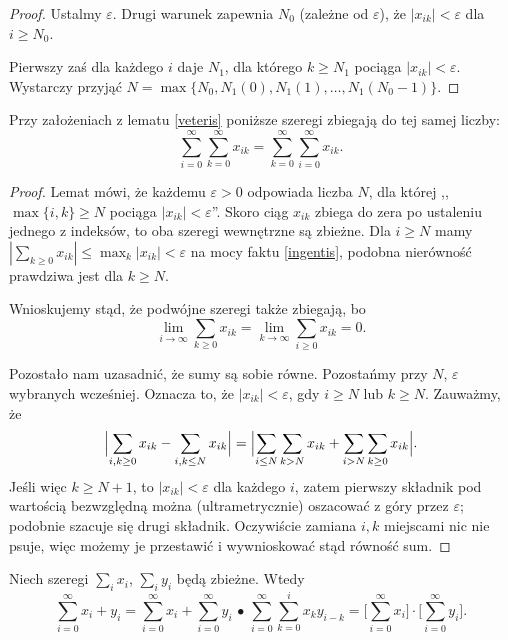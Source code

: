 \begin{proof}
	Ustalmy $\varepsilon$.
	Drugi warunek zapewnia $N_0$ (zależne od $\varepsilon$), że $|x_{ik}| < \varepsilon$ dla $i \ge N_0$.
	
	Pierwszy zaś dla każdego $i$ daje $N_1$, dla którego $k \ge N_1$ pociąga $|x_{ik}| < \varepsilon$.
	Wystarczy przyjąć $N = \max\{N_0, N_1(0), N_1(1), \ldots, N_1(N_0-1)\}$.
\end{proof}

\begin{fakt} \label{caedis}
	Przy założeniach z lematu \ref{veteris} poniższe szeregi zbiegają do tej samej liczby: \[\sum_{i = 0}^\infty \sum_{k = 0}^\infty x_{ik} = \sum_{k = 0}^\infty \sum_{i = 0}^\infty x_{ik}.\]
\end{fakt}

\begin{proof}
	Lemat mówi, że każdemu $\varepsilon > 0$ odpowiada liczba $N$, dla której ,,$\max \{i, k\} \ge N$ pociąga $|x_{ik}| < \varepsilon$''.
	Skoro ciąg $x_{ik}$ zbiega do zera po ustaleniu jednego z indeksów, to oba szeregi wewnętrzne są zbieżne.
	Dla $i \ge N$ mamy $|\sum_{k \ge 0} x_{ik}| \le \max_k |x_{ik}| < \varepsilon$ na mocy faktu \ref{ingentis}, podobna nierówność prawdziwa jest dla $k \ge N$.
	
	Wnioskujemy stąd, że podwójne szeregi także zbiegają, bo
	\[
		\lim_{i \to \infty} \sum_{k \ge 0} x_{ik} = \lim_{k \to \infty} \sum_{i \ge 0} x_{ik} = 0.
	\]

	Pozostało nam uzasadnić, że sumy są sobie równe.
	Pozostańmy przy $N$, $\varepsilon$ wybranych wcześniej.
	Oznacza to, że $|x_{ik}| < \varepsilon$, gdy $i \ge N$ lub $k \ge N$.
	Zauważmy, że 
	\[
		\Bigl|\sum_{i, k \ge 0} x_{ik} - \sum_{i, k \le N} x_{ik} \Bigr| = 
		\Bigl|\sum_{i \le N} \sum_{k > N} x_{ik} + \sum_{i > N} \sum_{k \ge 0} x_{ik} \Bigr|.
	\]
	Jeśli więc $k \ge N+1$, to $|x_{ik}| < \varepsilon$ dla każdego $i$, zatem pierwszy składnik pod wartością bezwzględną można (ultrametrycznie) oszacować z góry przez $\varepsilon$; podobnie szacuje się drugi składnik. Oczywiście zamiana $i, k$ miejscami nic nie psuje, więc możemy je przestawić i wywnioskować stąd równość sum.
\end{proof}

\begin{fakt} \label{ludmori}
	Niech szeregi $\sum_i x_i$, $\sum_i y_i$ będą zbieżne.
	Wtedy
	\[
		\sum_{i = 0}^\infty x_i + y_i = \sum_{i = 0}^\infty x_i + \sum_{i = 0}^\infty y_i \,\bullet\,
		\sum_{i = 0}^\infty \sum_{k = 0}^i x_k y_{i-k} = \Bigr[\sum_{i = 0}^\infty x_i\Bigr] \cdot \Bigr[ \sum_{i = 0}^\infty y_i\Bigr].
	\]
\end{fakt}

